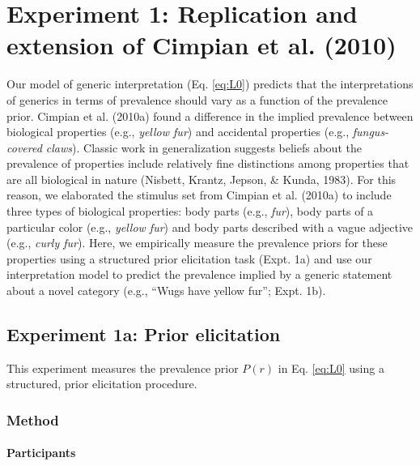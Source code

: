 \documentclass[,man,floatsintext]{apa6}
\let\oldparagraph\paragraph
\renewcommand{\paragraph}[1]{\oldparagraph{#1}\mbox{}}
\theoremstyle{definition}
\theoremstyle{definition}
\theoremstyle{definition}
\theoremstyle{remark}
\begin{document}
\hypertarget{experiment-1-replication-and-extension-of-cimpian-et-al.-2010}{%
\section{Experiment 1: Replication and extension of Cimpian et al.
(2010)}\label{experiment-1-replication-and-extension-of-cimpian-et-al.-2010}}

Our model of generic interpretation (Eq. \ref{eq:L0}) predicts that the
interpretations of generics in terms of prevalence should vary as a
function of the prevalence prior. Cimpian et al. (2010a) found a
difference in the implied prevalence between biological properties
(e.g., \emph{yellow fur}) and accidental properties (e.g.,
\emph{fungus-covered claws}). Classic work in generalization suggests
beliefs about the prevalence of properties include relatively fine
distinctions among properties that are all biological in nature
(Nisbett, Krantz, Jepson, \& Kunda, 1983). For this reason, we
elaborated the stimulus set from Cimpian et al. (2010a) to include three
types of biological properties: body parts (e.g., \emph{fur}), body
parts of a particular color (e.g., \emph{yellow fur}) and body parts
described with a vague adjective (e.g., \emph{curly fur}). Here, we
empirically measure the prevalence priors for these properties using a
structured prior elicitation task (Expt. 1a) and use our interpretation
model to predict the prevalence implied by a generic statement about a
novel category (e.g., \enquote{Wugs have yellow fur}; Expt. 1b).

\hypertarget{experiment-1a-prior-elicitation}{%
\subsection{Experiment 1a: Prior
elicitation}\label{experiment-1a-prior-elicitation}}

This experiment measures the prevalence prior \(P(r)\) in Eq.
\ref{eq:L0} using a structured, prior elicitation procedure.

\hypertarget{method}{%
\subsubsection{Method}\label{method}}

\hypertarget{participants}{%
\paragraph{Participants}\label{participants}}
\end{document}
